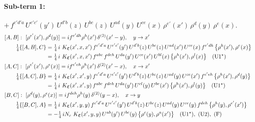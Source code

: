 \documentclass[10pt]{article}
\numberwithin{equation}{section}
\begin{document}
\paragraph{Sub-term 1:} $+\,f^{c'd'a}\,U^{e'c'}(y')\,U^{d'b}(z)\,U^{bc}(z)\,U^{ad}(y)\,U^{ce}(x)\,\rho^{e'}(x')\,\rho^{d}(y)\,\rho^{e}(x)$.
\begin{align}
&[A,B]:\ [\rho^{e'}(x'),\rho^{d}(y)]=i f^{e'dh}\rho^{h}(x')\,\delta^{(2)}(x'-y),\quad y\to x'\notag\\
&\qquad \tfrac14\{[A,B],C\}=\tfrac14\,i\,\,K_{\mathfrak C}(x',x,x')\,f^{c'd'a}\,U^{e'c'}(y')\,U^{d'b}(z)\,U^{bc}(z)\,U^{ad}(x')\,U^{ce}(x)\,f^{e'dh}\,\big\{\rho^{h}(x'),\rho^{e}(x)\big\}\notag\\
&\qquad\phantom{\tfrac14\{[A,B],C\}}=\tfrac14\,i\,\,K_{\mathfrak C}(x',x,x')\,f^{abc}\,f^{deh}\,U^{da}(y')\,U^{ce}(x')\,U^{bl}(x)\,\big\{\rho^{h}(x'),\rho^{l}(x)\big\}\quad\text{(U1$^\star$)}
\label{R:eq:GIII.VI-1-AB}\\
&[A,C]:\ [\rho^{e'}(x'),\rho^{e}(x)]=i f^{e'eh}\rho^{h}(x')\,\delta^{(2)}(x'-x),\quad x\to x'\notag\\
&\qquad \tfrac14\{[A,C],B\}=\tfrac14\,i\,\,K_{\mathfrak C}(x',x',y)\,f^{c'd'a}\,U^{e'c'}(y')\,U^{d'b}(z)\,U^{bc}(z)\,U^{ad}(y)\,U^{ce}(x')\,f^{e'eh}\,\big\{\rho^{h}(x'),\rho^{d}(y)\big\}\notag\\
&\qquad\phantom{\tfrac14\{[A,C],B\}}=\tfrac14\,i\,\,K_{\mathfrak C}(x',x',y)\,f^{abc}\,f^{deh}\,U^{da}(y')\,U^{cl}(y)\,U^{be}(x')\,\big\{\rho^{h}(x'),\rho^{l}(y)\big\}\quad\text{(U1$^\star$)}
\label{R:eq:GIII.VI-1-AC}\\
&[B,C]:\ [\rho^{d}(y),\rho^{e}(x)]=i f^{deh}\rho^{h}(y)\,\delta^{(2)}(y-x),\quad x\to y\notag\\
&\qquad \tfrac14\{[B,C],A\}=\tfrac14\,i\,\,K_{\mathfrak C}(x',y,y)\,f^{c'd'a}\,U^{e'c'}(y')\,U^{d'b}(z)\,U^{bc}(z)\,U^{ad}(y)\,U^{ce}(y)\,f^{deh}\,\big\{\rho^{h}(y),\rho^{e'}(x')\big\}\notag\\
&\qquad\phantom{\tfrac14\{[B,C],A\}}=-\tfrac14\,i N_{c}\,\,K_{\mathfrak C}(x',y,y)\,U^{ab}(y')\,U^{bc}(y)\,\big\{\rho^{c}(y),\rho^{a}(x')\big\}\quad\text{(U1$^\star$)},\ \text{(U2)},\ \text{(F)}
\label{R:eq:GIII.VI-1-BC}
\end{align}
\end{document}
